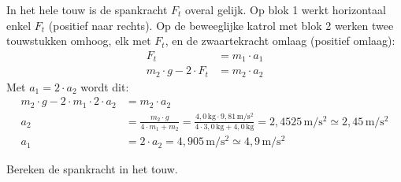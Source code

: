 \documentclass{ximera}
\newcommand{\blokje}[4][left]{\fill (#2,#3) circle (0.05); \node[#1, inner sep=3pt] at (#2,#3) {#4};}
\newcommand{\kr}[7][kracht]{\draw[#1] (#2,#3) -- ++(#4,#5) node[#6] {#7};}
\newcommand{\as}[6]{\draw[positie] (#1,#2) -- ++(#3,#4) node[#5] {#6};}
\begin{document}
\begin{exercise}
\begin{question}
\begin{solution}
            \begin{center}
            \end{center}

            In het hele touw is de spankracht $F_{t}$ overal gelijk. Op blok 1 werkt horizontaal enkel $F_{t}$ (positief naar rechts). Op de beweeglijke katrol met blok 2 werken twee touwstukken omhoog, elk met $F_{t}$, en de zwaartekracht omlaag (positief omlaag):
            \begin{align*}
                F_{t} &= m_{1} \cdot a_{1} \\
                m_{2} \cdot g - 2 \cdot F_{t} &= m_{2} \cdot a_{2}
            \end{align*}
            Met $a_{1} = 2 \cdot a_{2}$ wordt dit:
            \begin{align*}
                m_{2} \cdot g - 2 \cdot m_{1} \cdot 2 \cdot a_{2} &= m_{2} \cdot a_{2} \\
                a_{2} &= \frac{m_{2} \cdot g}{4 \cdot m_{1} + m_{2}} = \frac{4{,}0 \, \mathrm{kg} \cdot 9{,}81 \, \mathrm{m/s^2}}{4 \cdot 3{,}0 \, \mathrm{kg} + 4{,}0 \, \mathrm{kg}} = 2{,}4525 \, \mathrm{m/s^2} \simeq 2{,}45 \, \mathrm{m/s^2} \\
                a_{1} &= 2 \cdot a_{2} = 4{,}905 \, \mathrm{m/s^2} \simeq 4{,}9 \, \mathrm{m/s^2}
            \end{align*}
        \end{solution}
    \end{question}

    \begin{question}
        Bereken de spankracht in het touw.


\end{question}
\end{exercise}
\end{document}
